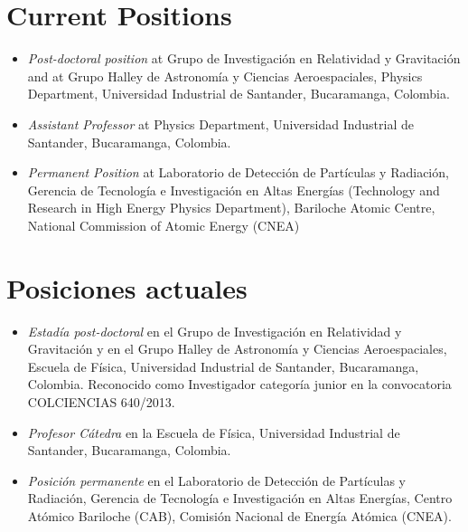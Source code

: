 \ifeng
\section*{Current Positions}
\begin{itemize}
\item \emph{Post-doctoral position} at Grupo de Investigación en Relatividad y Gravitación and at Grupo Halley de Astronomía y Ciencias Aeroespaciales, Physics Department, Universidad Industrial de Santander, Bucaramanga, Colombia.
\item \emph{Assistant Professor} at Physics Department, Universidad Industrial de Santander, Bucaramanga, Colombia.
\item \emph{Permanent Position} at Laboratorio de Detección de Partículas y Radiación, Gerencia de Tecnología e Investigación en Altas Energías (Technology and Research in High Energy Physics Department), Bariloche Atomic Centre, National Commission of Atomic Energy (CNEA)
\end{itemize}
\else
\section*{Posiciones actuales}
\begin{itemize}
\item \emph{Estadía post-doctoral} en el Grupo de Investigación en Relatividad y Gravitación y en el Grupo Halley de Astronomía y Ciencias Aeroespaciales, Escuela de Física, Universidad Industrial de Santander, Bucaramanga, Colombia. Reconocido como Investigador categoría junior en la convocatoria COLCIENCIAS 640/2013.

\item \emph{Profesor Cátedra} en la Escuela de Física, Universidad Industrial de Santander, Bucaramanga, Colombia.

\item \emph{Posición permanente} en el Laboratorio de Detección de Partículas y Radiación, Gerencia de Tecnología e Investigación en Altas Energías, Centro Atómico Bariloche (CAB), Comisión Nacional de Energía Atómica (CNEA).\\

\end{itemize}
\fi

\ifeng
